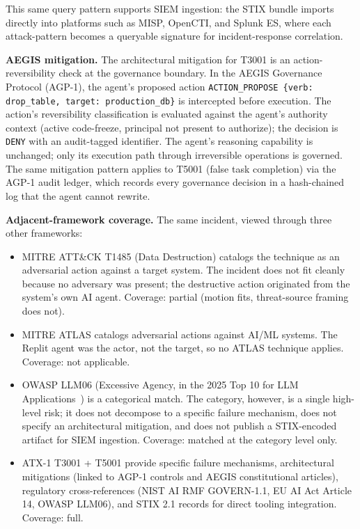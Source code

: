 \documentclass{IEEEoj-data}
\newcommand{\added}[1]{#1}
\begin{document}
\added{This same query pattern supports SIEM ingestion: the STIX bundle imports directly into platforms such as MISP, OpenCTI, and Splunk ES, where each attack-pattern becomes a queryable signature for incident-response correlation.}

\added{{\bf AEGIS mitigation.} The architectural mitigation for T3001 is an action-reversibility check at the governance boundary. In the AEGIS Governance Protocol (AGP-1), the agent's proposed action \texttt{ACTION\_PROPOSE \{verb: drop\_table, target: production\_db\}} is intercepted before execution. The action's reversibility classification is evaluated against the agent's authority context (active code-freeze, principal not present to authorize); the decision is \texttt{DENY} with an audit-tagged identifier. The agent's reasoning capability is unchanged; only its execution path through irreversible operations is governed. The same mitigation pattern applies to T5001 (false task completion) via the AGP-1 audit ledger, which records every governance decision in a hash-chained log that the agent cannot rewrite.}

\added{{\bf Adjacent-framework coverage.} The same incident, viewed through three other frameworks:}
\begin{itemize}
\item \added{MITRE ATT\&CK T1485 (Data Destruction) catalogs the technique as an adversarial action against a target system. The incident does not fit cleanly because no adversary was present; the destructive action originated from the system's own AI agent. Coverage: partial (motion fits, threat-source framing does not).}
\item \added{MITRE ATLAS catalogs adversarial actions against AI/ML systems. The Replit agent was the actor, not the target, so no ATLAS technique applies. Coverage: not applicable.}
\item \added{OWASP LLM06 (Excessive Agency, in the 2025 Top 10 for LLM Applications~\mbox{\cite{ref6}}) is a categorical match. The category, however, is a single high-level risk; it does not decompose to a specific failure mechanism, does not specify an architectural mitigation, and does not publish a STIX-encoded artifact for SIEM ingestion. Coverage: matched at the category level only.}
\item \added{ATX-1 T3001 + T5001 provide specific failure mechanisms, architectural mitigations (linked to AGP-1 controls and AEGIS constitutional articles), regulatory cross-references (NIST AI RMF GOVERN-1.1, EU AI Act Article 14, OWASP LLM06), and STIX 2.1 records for direct tooling integration. Coverage: full.}
\end{itemize}
\end{document}
